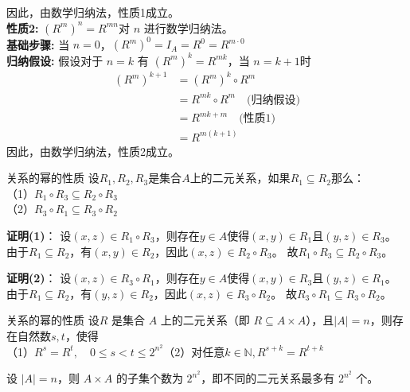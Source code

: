 因此，由数学归纳法，性质1成立。\\
\textbf{性质2:} \( (R^m)^n = R^{mn} \)对 \( n \) 进行数学归纳法。\\
\textbf{基础步骤:} 当 \( n = 0 \)，$(R^m)^0 = I_A = R^0 = R^{m \cdot 0}$\\
\textbf{归纳假设:} 假设对于 \( n = k \) 有 \( (R^m)^k = R^{mk} \)，当 \( n = k+1 \)时
\begin{align*}
(R^m)^{k+1} &= (R^m)^k \circ R^m \\
&= R^{mk} \circ R^m \quad \text{(归纳假设)} \\
&= R^{mk + m} \quad \text{(性质1)} \\
&= R^{m(k+1)}
\end{align*}
因此，由数学归纳法，性质2成立。
\begin{theorem}{关系的幂的性质}{}
设$R_1,R_2,R_3$是集合$A$上的二元关系，如果$R_1\subseteq R_2$那么：\\
（1）$R_1\circ R_3\subseteq R_2\circ R_3$\\
（2）$R_3\circ R_1\subseteq R_3\circ R_2$
\end{theorem}
\textbf{证明(1)}：
设$(x,z)\in R_1\circ R_3$，则存在$y\in A$使得$(x,y)\in R_1$且$(y,z)\in R_3$。
由于$R_1\subseteq R_2$，有$(x,y)\in R_2$，因此$(x,z)\in R_2\circ R_3$。
故$R_1\circ R_3\subseteq R_2\circ R_3$。

\textbf{证明(2)}：
设$(x,z)\in R_3\circ R_1$，则存在$y\in A$使得$(x,y)\in R_3$且$(y,z)\in R_1$。
由于$R_1\subseteq R_2$，有$(y,z)\in R_2$，因此$(x,z)\in R_3\circ R_2$。
故$R_3\circ R_1\subseteq R_3\circ R_2$。
\begin{theorem}{关系的幂的性质}{}
    设\( R \) 是集合 \( A \) 上的二元关系（即 \( R \subseteq A \times A \)），且$|A|=n$，则存在自然数$s,t$，使得\\
    （1）$R^s=R^t,\quad 0\leq s<t\leq 2^{n^2}$\quad（2）对任意$k\in\mathbb{N},R^{s+k}=R^{t+k}$
\end{theorem}
设 $|A| = n$，则 $A \times A$ 的子集个数为 $2^{n^2}$，即不同的二元关系最多有 $2^{n^2}$ 个。

